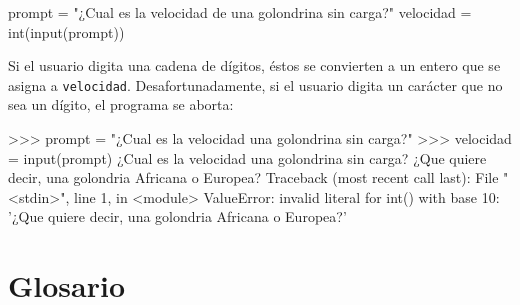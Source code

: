 \beforeverb
\begin{pythoncode}
prompt = "¿Cual es la velocidad de una golondrina sin carga?\n"
velocidad = int(input(prompt))
\end{pythoncode}
\afterverb
%

Si el usuario digita una cadena de dígitos, éstos se convierten
a un entero que se asigna a \texttt{velocidad}.  Desafortunadamente, si el 
usuario digita un carácter que no sea un dígito, el programa se aborta:

\beforeverb
\begin{pyconcode}
>>> prompt = "¿Cual es la velocidad una golondrina sin carga?\n"
>>> velocidad = input(prompt)
¿Cual es la velocidad una golondrina sin carga?
¿Que quiere decir, una golondria Africana o Europea?
Traceback (most recent call last):
  File "<stdin>", line 1, in <module>
ValueError: invalid literal for int() with base 10: '¿Que quiere decir, una 
golondria Africana o Europea?'
\end{pyconcode}
\afterverb
%

\section{Glosario}

